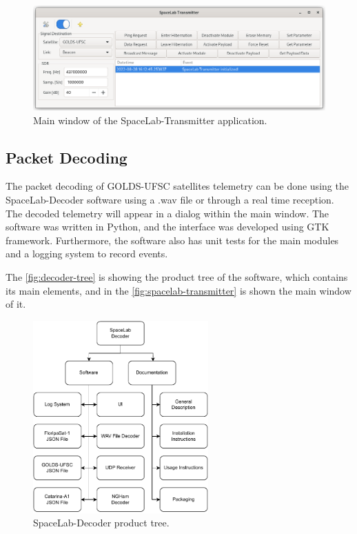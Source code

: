 \begin{figure}[!ht]
    \begin{center}
        \includegraphics[width=\textwidth]{figures/spacelab-transmitter-window.png}
        \caption{Main window of the SpaceLab-Transmitter application.}
        \label{fig:spacelab-transmitter}
    \end{center}
\end{figure}

\subsection{Packet Decoding}

The packet decoding of GOLDS-UFSC satellites telemetry can be done using the SpaceLab-Decoder \cite{spacelab-decoder} software using a .wav file or through a real time reception. The decoded telemetry will appear in a dialog within the main window. The software was written in Python, and the interface was developed using GTK framework. Furthermore, the software also has unit tests for the main modules and a logging system to record events.

The \autoref{fig:decoder-tree} is showing the product tree of the software, which contains its main elements, and in the \autoref{fig:spacelab-transmitter} is shown the main window of it.

\begin{figure}[!ht]
    \begin{center}
        \includegraphics[width=0.6\textwidth]{figures/decoder_tree.pdf}
        \caption{SpaceLab-Decoder product tree.}
        \label{fig:decoder-tree}
    \end{center}
\end{figure}

